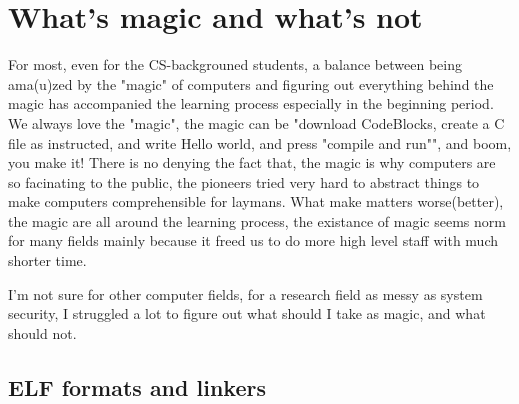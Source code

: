 \section{What's magic and what's not}
For most, even for the CS-backgrouned students, a balance between being ama(u)zed by the "magic" of computers and figuring out everything behind the magic 
has accompanied the learning process especially in the beginning period.
We always love the "magic", the magic can be "download CodeBlocks, create a C file as instructed, and write Hello world, and press "compile and run"", and boom, you make it!
There is no denying the fact that, the magic is why computers are so facinating to the public, the pioneers tried very hard to abstract things to make computers comprehensible
for laymans. What make matters worse(better), the magic are all around the learning process, the existance of magic seems norm for many fields mainly because it freed us to do
more high level staff with much shorter time.

I'm not sure for other computer fields, for a research field as messy as system security, I struggled a lot to figure out what should I take as magic, and what should not.

\subsection{ELF formats and linkers}